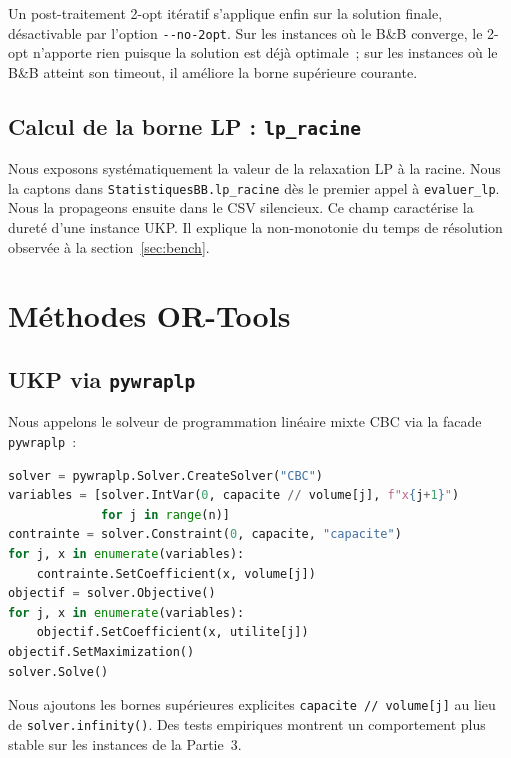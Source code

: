 \documentclass[11pt,a4paper]{article}
\begin{document}
Un post-traitement 2-opt itératif s'applique enfin sur la solution finale, désactivable par l'option \texttt{-{}-no-2opt}. Sur les instances où le B\&B converge, le 2-opt n'apporte rien puisque la solution est déjà optimale~; sur les instances où le B\&B atteint son timeout, il améliore la borne supérieure courante.

\subsection{Calcul de la borne LP : \texttt{lp\_racine}}

Nous exposons systématiquement la valeur de la relaxation LP à la racine. Nous la captons dans \texttt{StatistiquesBB.lp\_racine} dès le premier appel à \texttt{evaluer\_lp}. Nous la propageons ensuite dans le CSV silencieux. Ce champ caractérise la dureté d'une instance UKP. Il explique la non-monotonie du temps de résolution observée à la section~\ref{sec:bench}.

\section{Méthodes OR-Tools}
\label{sec:ortools}

\subsection{UKP via \texttt{pywraplp}}

Nous appelons le solveur de programmation linéaire mixte CBC via la facade \texttt{pywraplp}~:
\begin{lstlisting}[language=Python, caption={Formulation OR-Tools du UKP}]
solver = pywraplp.Solver.CreateSolver("CBC")
variables = [solver.IntVar(0, capacite // volume[j], f"x{j+1}")
             for j in range(n)]
contrainte = solver.Constraint(0, capacite, "capacite")
for j, x in enumerate(variables):
    contrainte.SetCoefficient(x, volume[j])
objectif = solver.Objective()
for j, x in enumerate(variables):
    objectif.SetCoefficient(x, utilite[j])
objectif.SetMaximization()
solver.Solve()
\end{lstlisting}

Nous ajoutons les bornes supérieures explicites \texttt{capacite // volume[j]} au lieu de \texttt{solver.infinity()}. Des tests empiriques montrent un comportement plus stable sur les instances de la Partie~3.
\end{document}
